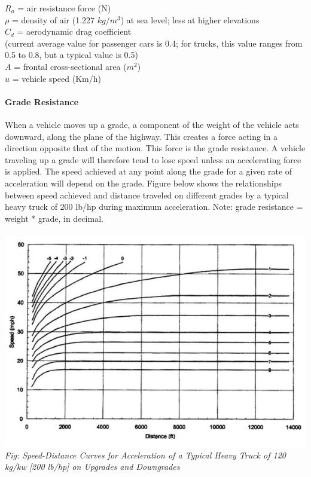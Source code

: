 \hspace*{10mm}$R_a$ = air resistance force (N)\\
\hspace*{10mm}$\rho$ = density of air (1.227 $ kg/m^3 $) at sea level; less at higher elevations\\
\hspace*{10mm}$C_d$ = aerodynamic drag coefficient\\
\hspace*{10mm}(current average value for passenger cars is 0.4; for trucks, this value ranges from 0.5 to 0.8, but a typical value is 0.5)\\
\hspace*{10mm}$A$ = frontal cross-sectional area ($ m^2 $)\\
\hspace*{10mm}$u$ = vehicle speed (Km/h)
\paragraph{Grade Resistance}
When a vehicle moves up a grade, a component of the weight of the vehicle acts downward, along the plane of the highway. This creates a force acting in a direction opposite that of the motion. This force is the grade resistance. A vehicle traveling up a grade will therefore tend to lose speed unless an accelerating force is applied. The speed achieved at any point along the grade for a given rate of acceleration will depend on the grade. Figure below shows the relationships between speed achieved and distance traveled on different grades by a typical heavy truck of 200 lb/hp during maximum acceleration. Note: grade resistance = weight * grade, in decimal.\\\\
\includegraphics{gfx/fig8.png}
\emph{Fig: Speed-Distance Curves for Acceleration of a Typical Heavy Truck of 120 kg/kw [200 lb/hp] on Upgrades and Downgrades}
